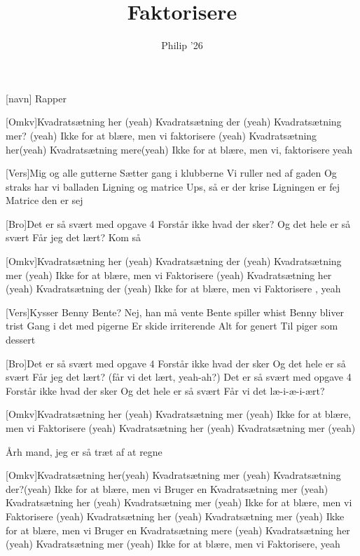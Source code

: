 \documentclass[a4paper,11pt]{article}
\title{Faktorisere}
\author{Philip '26}
\begin{document}
\maketitle

\begin{roles}
[navn] Rapper
\end{roles}

\begin{song}
[Omkv]Kvadratsætning her (yeah)
Kvadratsætning der (yeah)
Kvadratsætning mer? (yeah)
Ikke for at blære, men vi
faktorisere (yeah)
Kvadratsætning her(yeah)
Kvadratsætning mere(yeah)
Ikke for at blære, men vi, faktorisere yeah

[Vers]Mig og alle gutterne
Sætter gang i klubberne 
Vi ruller ned af gaden
Og straks har vi balladen
Ligning og matrice
Ups, så er der krise
Ligningen er fej
Matrice den er sej

[Bro]Det er så svært med opgave 4
Forstår ikke hvad der sker?
Og det hele er så svært
Får jeg det lært? Kom så

[Omkv]Kvadratsætning her (yeah)
Kvadratsætning der (yeah)
Kvadratsætning mer (yeah)
Ikke for at blære, men vi
Faktorisere (yeah)
Kvadratsætning her (yeah)
Kvadratsætning der (yeah)
Ikke for at blære, men vi Faktorisere , yeah

[Vers]Kysser Benny Bente?
Nej, han må vente
Bente spiller whist
Benny bliver trist
Gang i det med pigerne
Er skide irriterende
Alt for genert
Til piger som dessert

[Bro]Det er så svært med opgave 4
Forstår ikke hvad der sker
Og det hele er så svært
Får jeg det lært? (får vi det lært, yeah-ah?)
Det er så svært med opgave 4
Forstår ikke hvad der sker
Og det hele er så svært
Får vi det læ-i-æ-i-ært?

[Omkv]Kvadratsætning her (yeah)
Kvadratsætning mer (yeah)
Ikke for at blære, men vi
Faktorisere (yeah)
Kvadratsætning her (yeah)
Kvadratsætning mer (yeah)

Årh mand, jeg er så træt af at regne

[Omkv]Kvadratsætning her(yeah)
Kvadratsætning mer (yeah)
Kvadratsætning der?(yeah)
Ikke for at blære, men vi
Bruger en Kvadratsætning mer (yeah)
Kvadratsætning her (yeah)
Kvadratsætning mer (yeah)
Ikke for at blære, men vi
Faktorisere (yeah)
Kvadratsætning her (yeah)
Kvadratsætning mer (yeah)
Ikke for at blære, men vi
Bruger en Kvadratsætning mere (yeah)
Kvadratsætning her (yeah)
Kvadratsætning mer (yeah)
Ikke for at blære, men vi Faktorisere, yeah

\end{song}
\end{document}
